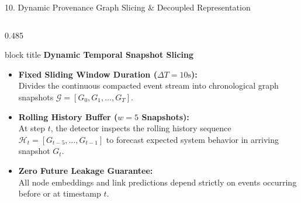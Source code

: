 \documentclass[aspectratio=169,10pt]{beamer}
\begin{document}
\begin{frame}{10. Dynamic Provenance Graph Slicing \& Decoupled Representation}
\vspace{-0.2em}
\begin{columns}[T]
\begin{column}{0.485\textwidth}
\begin{beamercolorbox}[rounded=true,shadow=false,sep=0.30em,wd=\linewidth]{block title}
\textbf{\scriptsize Dynamic Temporal Snapshot Slicing}
\end{beamercolorbox}
\vspace{0.12em}
{\fontsize{7.0pt}{9.8pt}\selectfont
\begin{itemize}\itemsep0.22em
  \item \textbf{Fixed Sliding Window Duration ($\Delta T = 10\text{s}$):}\\
  Divides the continuous compacted event stream into chronological graph snapshots $\mathcal{G} = [G_0, G_1, \dots, G_T]$.
  \item \textbf{Rolling History Buffer ($w = 5$ Snapshots):}\\
  At step $t$, the detector inspects the rolling history sequence $\mathcal{H}_t = [G_{t-5}, \dots, G_{t-1}]$ to forecast expected system behavior in arriving snapshot $G_t$.
  \item \textbf{Zero Future Leakage Guarantee:}\\
  All node embeddings and link predictions depend strictly on events occurring before or at timestamp $t$.
\end{itemize}
}
\end{column}


\end{columns}
\end{frame}
\end{document}
